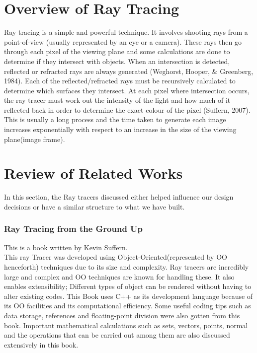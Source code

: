\documentclass[a4paper]{report}
\begin{document}
	\section{Overview of Ray Tracing}
	\par Ray tracing is a simple and powerful technique. It involves shooting rays from a point-of-view (usually represented by an eye or a camera). These rays then go through each pixel of the viewing plane and some calculations are done to determine if they intersect with objects. When an intersection is detected, reflected or refracted rays are always generated (Weghorst, Hooper, \& Greenberg, 1984). Each of the reflected/refracted rays must be recursively calculated to determine which surfaces they intersect. At each pixel where intersection occurs, the ray tracer must work out the intensity of the light and how much of it reflected back in order to determine the exact colour of the pixel (Suffern, 2007). This is usually a long process and the time taken to generate each image increases exponentially with respect to an increase in the size of the viewing plane(image frame).\\
	
	\section{Review of Related Works}
	\par In this section, the Ray tracers discussed either helped influence our design decisions or have a similar structure to what we have built.
	\subsubsection{Ray Tracing from the Ground Up}
	\label{sssec:book}
	\par This is a book written by Kevin Suffern.\\
	
	This ray Tracer was developed using Object-Oriented(represented by OO henceforth) techniques due to its size and complexity. Ray tracers are incredibly large and complex and OO techniques are known for handling these. It also enables extensibility; Different types of object can be rendered without having to alter existing codes. This Book uses C++ as its development language because of its OO facilities and its computational efficiency. Some useful coding tips such as data storage, references and floating-point division were also gotten from this book. Important mathematical calculations such as sets, vectors, points, normal and the operations that can be carried out among them are also discussed extensively in this book.\\
	
\end{document}
